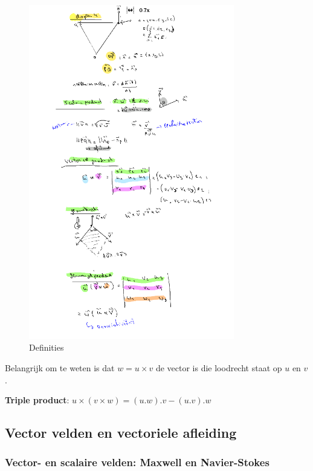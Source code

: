 \documentclass[a4paper]{report}
\begin{document}
\begin{figure}[H]
	\centering
	\includegraphics[width=0.8\textwidth]{assets/termen_h4.png}
	\caption{Definities}
	\label{fig:termen_h4}
\end{figure}

Belangrijk om te weten is dat $w = u \times v$ de vector is die loodrecht staat op $u$ en $v$.

\textbf{Triple product}: $u \times (v \times w) =  (u . w) . v - (u . v) . w$

\subsection{Vector velden en vectoriele afleiding}

\subsubsection{Vector- en scalaire velden: Maxwell en Navier-Stokes}
\end{document}
